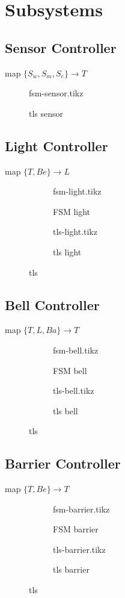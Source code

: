 \documentclass[final]{report}
\begin{document}
\chapter{Subsystems}

\section{Sensor Controller}
map $\{S_{w},S_{m},S_{e}\} \rightarrow T$

	\begin{figure}[H]
		\centering
		{fsm-sensor.tikz}
		\caption{tls sensor}
		\label{fig:tls-sensor}
	\end{figure}

\section{Light Controller}
map $\{T,Be\} \rightarrow L$
	\begin{figure}[H]
		\centering
			\begin{subfigure}[b]{0.4\textwidth}
		\centering
				{fsm-light.tikz}
				\caption{FSM light}
				\label{fig:fsm-light}
			\end{subfigure}
			\begin{subfigure}[b]{0.4\textwidth}
		\centering
				{tls-light.tikz}
				\caption{tls light}
				\label{fig:tls-light}
			\end{subfigure}
		\caption{tls}
		\label{fig:light}
	\end{figure}

\section{Bell Controller}
map $\{T,L,Ba\} \rightarrow T$
	\begin{figure}[H]
		\centering
			\begin{subfigure}[b]{0.4\textwidth}
				{fsm-bell.tikz}
				\caption{FSM bell}
				\label{fig:fsm-bell}
			\end{subfigure}
			\begin{subfigure}[b]{0.4\textwidth}
				{tls-bell.tikz}
				\caption{tls bell}
				\label{fig:tls-bell}
			\end{subfigure}
		\caption{tls}
		\label{fig:bell}
	\end{figure}


\section{Barrier Controller}
map $\{T,Be\} \rightarrow T$
	\begin{figure}[H]
		\centering
			\begin{subfigure}[b]{0.4\textwidth}
				{fsm-barrier.tikz}
				\caption{FSM barrier}
				\label{fig:fsm-barrier}
			\end{subfigure}
			\begin{subfigure}[b]{0.4\textwidth}
				{tls-barrier.tikz}
				\caption{tls barrier}
				\label{fig:tls-barrier}
			\end{subfigure}
		\caption{tls}
		\label{fig:barrier}
	\end{figure}
\end{document}
